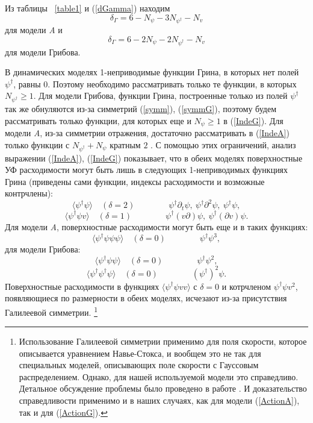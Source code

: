 \documentclass[a4paper,10pt]{article}
\begin{document}
Из таблицы ~\ref{table1} и (\ref{dGamma}) находим
\begin{equation}
\delta_{\Gamma}= 6 - N_{\psi} - 3N_{\psi^{\dag}} - N_{v}
\label{IndeA}
\end{equation}
для модели {\it A} и
\begin{equation}
\delta_{\Gamma}= 6 - 2N_{\psi} - 2N_{\psi^{\dag}} - N_{v}
\label{IndeG}
\end{equation}
для модели Грибова.

В динамических моделях 1-неприводимые функции Грина, в которых нет полей
$\psi^{\dag}$, равны $0$. Поэтому необходимо рассматривать только те функции, в которых  $N_{\psi^{\dag}} \ge 1$.
Для модели Грибова, функции Грина, построенные только из полей $\psi^{\dag}$ так же обнуляются из-за симметрий
(\ref{symm}), (\ref{symmG}), поэтому будем рассматривать только функции, для которых еще и $N_{\psi}\ge1$
в (\ref{IndeG}). Для модели {\it A}, из-за симметрии отражения,
достаточно рассматривать в  (\ref{IndeA}) только функции с $N_{\psi^{\dag}}+N_{\psi}$ кратным $2$ . С помощью этих ограничений, анализ выражении  (\ref{IndeA}), (\ref{IndeG}) 
показывает, что в обеих моделях поверхностные УФ расходимости могут быть лишь в следующих 1-неприводимых функциях Грина (приведены сами функции, 
индексы расходимости и возможные контрчлены):
\[ \langle \psi^{\dag} \psi \rangle \quad (\delta=2) \quad
 \quad \quad \quad \psi^{\dag}\partial_{t}\psi, \
\psi^{\dag}\partial^{2}\psi, \ \psi^{\dag}\psi, \]
\[ \langle \psi^{\dag} \psi v \rangle \quad (\delta=1) \quad
  \quad \quad  \quad \psi^{\dag} (v\partial) \psi, \
\psi^{\dag} (\partial v) \psi.  \]
Для модели {\it A}, поверхностные расходимости могут быть еще и в таких функциях:
\[ \langle \psi^{\dag} \psi\psi\psi \rangle \quad (\delta=0) \quad
  \quad  \quad \quad \psi^{\dag} \psi^{3}, \]
для модели Грибова:
\[ \langle \psi^{\dag} \psi\psi \rangle \quad (\delta=0) \quad
  \quad \quad  \quad \psi^{\dag} \psi^{2}, \]
\[ \langle \psi^{\dag} \psi^{\dag}\psi \rangle \quad (\delta=0) \quad
  \quad \quad \quad (\psi^{\dag})^{2} \psi. \]
Поверхностные расходимости в функциях
$\langle \psi^{\dag} \psi vv \rangle$ с $\delta=0$ и котрчленом $\psi^{\dag} \psi v^{2}$, появляющиеся по размерности в обеих моделях, исчезают из-за присутствия Галилеевой симметрии.
\footnote{Использование Галилеевой симметрии применимо для поля скорости, которое описывается уравнением Навье-Стокса, 
и вообщем это не так для специальных моделей, описывающих поле скорости с Гауссовым распределением.
Однако, для нашей используемой модели это справедливо. Детальное обсуждение проблемы было проведено в работе \cite{Alexa}. И доказательство справедливости применимо и в наших случаях, как
для модели (\ref{ActionA}), так и для  (\ref{ActionG}).}
\end{document}

